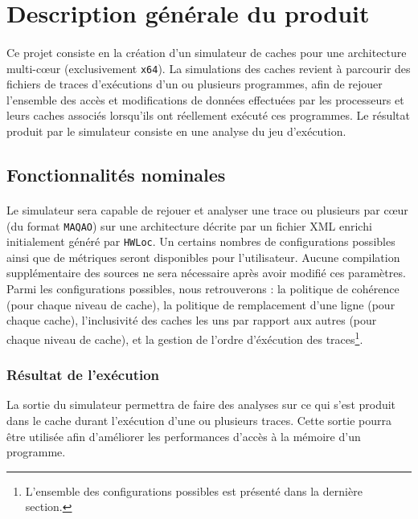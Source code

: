 \section{Description générale du produit}

\paragraph{}
Ce projet consiste en la création d'un simulateur de caches pour une architecture multi-c\oe ur (exclusivement \verb!x64!). La simulations des caches revient à parcourir des fichiers de traces d'exécutions d'un ou plusieurs programmes, afin de rejouer l'ensemble des accès et modifications de données effectuées par les processeurs et leurs caches associés lorsqu'ils ont réellement exécuté ces programmes. Le résultat produit par le simulateur consiste en une analyse du jeu d'exécution.

\subsection{Fonctionnalités nominales}

\paragraph{}
Le simulateur sera capable de rejouer et analyser une trace ou plusieurs par c\oe ur (du format \texttt{MAQAO}) sur une architecture décrite par un fichier XML enrichi initialement généré par \texttt{HWLoc}. Un certains nombres de configurations possibles ainsi que de métriques seront disponibles pour l'utilisateur. Aucune compilation supplémentaire des sources ne sera nécessaire après avoir modifié ces paramètres. Parmi les configurations possibles, nous retrouverons : la politique de cohérence (pour chaque niveau de cache), la politique de remplacement d'une ligne (pour chaque cache), l'inclusivité des caches les uns par rapport aux autres (pour chaque niveau de cache), et la gestion de l'ordre d'éxécution des traces\footnote{L'ensemble des configurations possibles est présenté dans la dernière section.}.

\subsubsection{Résultat de l'exécution}
La sortie du simulateur permettra de faire des analyses sur ce qui s'est produit dans le cache durant l'exécution d'une ou plusieurs traces. Cette sortie pourra être utilisée afin d'améliorer les performances d'accès à la mémoire d'un programme.


